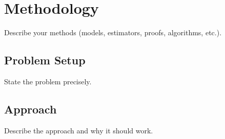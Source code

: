 \chapter{Methodology}

Describe your methods (models, estimators, proofs, algorithms, etc.).

\section{Problem Setup}
State the problem precisely.

\section{Approach}
Describe the approach and why it should work.
